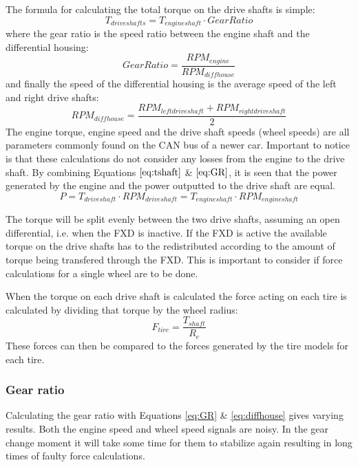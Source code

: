 The formula for calculating the total torque on the drive shafts is simple:
\begin{equation}
\label{eq:tshaft}
T_{driveshafts} = T_{engineshaft}\cdot GearRatio
\end{equation}
where the gear ratio is the speed ratio between the engine shaft and the differential housing:
\begin{equation}
\label{eq:GR}
Gear Ratio = \frac{RPM_{engine}}{RPM_{diffhouse}}
\end{equation}
and finally the speed of the differential housing is the average speed of the left and right drive shafts:
\begin{equation}
\label{eq:diffhouse}
RPM_{diffhouse} = \frac{RPM_{leftdriveshaft}+RPM_{rightdriveshaft}}{2}
\end{equation}
The engine torque, engine speed and the drive shaft speeds (wheel speeds) are all parameters commonly found on the CAN bus of a newer car. Important to notice is that these calculations do not consider any losses from the engine to the drive shaft. By combining Equations $ \ref{eq:tshaft} $ \& $ \ref{eq:GR} $, it is seen that the power generated by the engine and the power outputted to the drive shaft are equal.
\begin{equation}
P = T_{driveshaft}\cdot RPM_{driveshaft} = T_{engineshaft}\cdot RPM_{engineshaft}
\end{equation}

The torque will be split evenly between the two drive shafts, assuming an open differential, i.e. when the FXD is inactive. If the FXD is active the available torque on the drive shafts has to the redistributed according to the amount of torque being transfered through the FXD. This is important to consider if force calculations for a single wheel are to be done. 

When the torque on each drive shaft is calculated the force acting on each tire is calculated by dividing that torque by the wheel radius:
\begin{equation}
\label{eq:tireforce}
F_{tire} = \frac{T_{shaft}}{R_{e}}
\end{equation}
These forces can then be compared to the forces generated by the tire models for each tire.

\subsubsection{Gear ratio}
Calculating the gear ratio with Equations \ref{eq:GR} \& \ref{eq:diffhouse} gives varying results. Both the engine speed and wheel speed signals are noisy. In the gear change moment it will take some time for them to stabilize again resulting in long times of faulty force calculations. 

